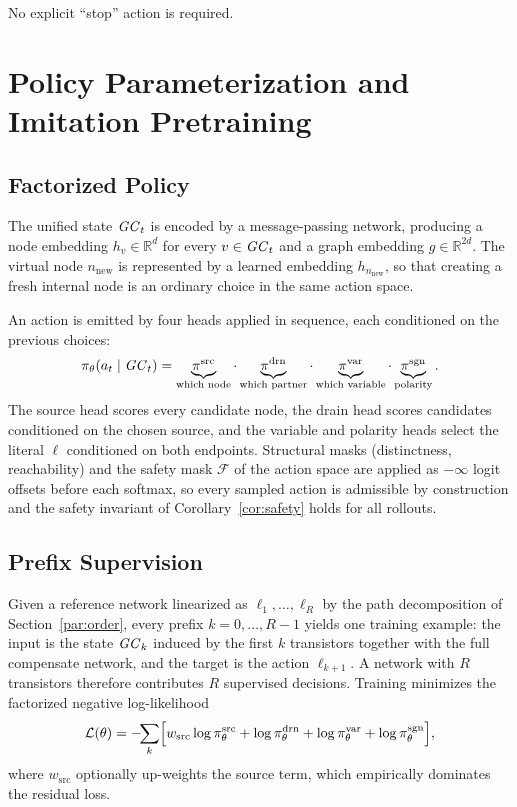 \documentclass[11pt, a4paper]{article}
\theoremstyle{plain}
\theoremstyle{definition}
\theoremstyle{remark}
\newcommand{\GC}[1][]{\mathit{GC}\if\relax\detokenize{#1}\relax\else_{#1}\fi}
\newcommand{\nnew}{n_{\mathrm{new}}}
\begin{document}
No explicit ``stop'' action is required.

\section{Policy Parameterization and Imitation Pretraining}
\label{sec:pretrain}

\subsection{Factorized Policy}

The unified state $\GC[t]$ is encoded by a message-passing network,
producing a node embedding $h_v \in \mathbb{R}^{d}$ for every
$v \in \GC[t]$ and a graph embedding $g \in \mathbb{R}^{2d}$.  The
virtual node $\nnew$ is represented by a learned embedding
$h_{\nnew}$, so that creating a fresh internal node is an ordinary
choice in the same action space.

An action is emitted by four heads applied in sequence, each
conditioned on the previous choices:
\[
  \pi_\theta(a_t \mid \GC[t])
  = \underbrace{\pi^{\mathrm{src}}}_{\text{which node}}
    \cdot
    \underbrace{\pi^{\mathrm{drn}}}_{\text{which partner}}
    \cdot
    \underbrace{\pi^{\mathrm{var}}}_{\text{which variable}}
    \cdot
    \underbrace{\pi^{\mathrm{sgn}}}_{\text{polarity}} .
\]
The source head scores every candidate node, the drain head scores
candidates conditioned on the chosen source, and the variable and
polarity heads select the literal $\ell$ conditioned on both endpoints.
Structural masks (distinctness, reachability) and the safety mask
$\mathcal{F}$ of the action space are applied as
$-\infty$ logit offsets before each softmax, so every sampled action is
admissible by construction and the safety invariant of
Corollary~\ref{cor:safety} holds for all rollouts.

\subsection{Prefix Supervision}

Given a reference network linearized as $\ell_1,\dots,\ell_R$ by the
path decomposition of Section~\ref{par:order}, every prefix
$k = 0,\dots,R-1$ yields one training example: the input is the state
$\GC[k]$ induced by the first $k$ transistors together with the full
compensate network, and the target is the action $\ell_{k+1}$.  A
network with $R$ transistors therefore contributes $R$ supervised
decisions.  Training minimizes the factorized negative log-likelihood
\[
  \mathcal{L}(\theta)
  = -\!\!\sum_{k}\Bigl[
      w_{\mathrm{src}} \log \pi^{\mathrm{src}}_\theta
    + \log \pi^{\mathrm{drn}}_\theta
    + \log \pi^{\mathrm{var}}_\theta
    + \log \pi^{\mathrm{sgn}}_\theta
    \Bigr],
\]
where $w_{\mathrm{src}}$ optionally up-weights the source term, which
empirically dominates the residual loss.
\end{document}
